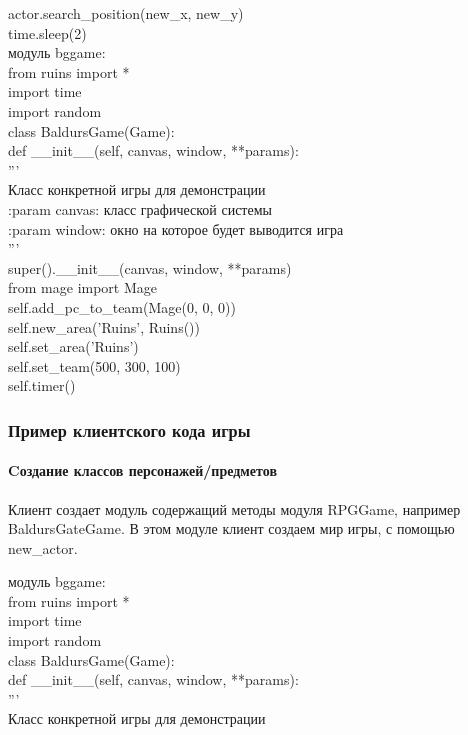 actor.search\_position(new\_x, new\_y)\\

time.sleep(2)\\

модуль bggame:\\
from ruins import *\\
import time\\
import random\\

class BaldursGame(Game):\\
def \_\_init\_\_(self, canvas, window, **params):\\
'''\\
Класс конкретной игры для демонстрации\\

:param canvas: класс графической системы\\
:param window: окно на которое будет выводится игра\\
'''\\
super().\_\_init\_\_(canvas, window, **params)\\
from mage import Mage\\
self.add\_pc\_to\_team(Mage(0, 0, 0))\\
self.new\_area('Ruins', Ruins())\\
self.set\_area('Ruins')\\
self.set\_team(500, 300, 100)\\
self.timer()\\

\subsubsection{Пример клиентского кода игры}
\paragraph{Cоздание классов персонажей/предметов}
Клиент создает модуль содержащий методы модуля RPGGame, например BaldursGateGame. В этом модуле клиент создаем мир игры, с помощью new\_actor. 

модуль bggame:\\
from ruins import *\\
import time\\
import random\\

class BaldursGame(Game):\\
def \_\_init\_\_(self, canvas, window, **params):\\
'''\\
Класс конкретной игры для демонстрации\\

